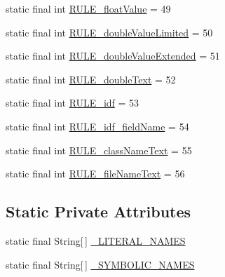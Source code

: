 \begin{DoxyCompactItemize}
\item 
static final int \hyperlink{classgov_1_1nasa_1_1jpf_1_1inspector_1_1server_1_1expression_1_1parser_1_1_expression_grammar_parser_a99701f7d45f221040419b8cb8bd2f5bd}{R\+U\+L\+E\+\_\+float\+Value} = 49
\item 
static final int \hyperlink{classgov_1_1nasa_1_1jpf_1_1inspector_1_1server_1_1expression_1_1parser_1_1_expression_grammar_parser_adc313d7e41c4bd2bc70fd3c607d4f57b}{R\+U\+L\+E\+\_\+double\+Value\+Limited} = 50
\item 
static final int \hyperlink{classgov_1_1nasa_1_1jpf_1_1inspector_1_1server_1_1expression_1_1parser_1_1_expression_grammar_parser_a2894a880588876977c9a53fd38cfa1c2}{R\+U\+L\+E\+\_\+double\+Value\+Extended} = 51
\item 
static final int \hyperlink{classgov_1_1nasa_1_1jpf_1_1inspector_1_1server_1_1expression_1_1parser_1_1_expression_grammar_parser_ac6636ee75a7a441a8ecfe4014c70b3cd}{R\+U\+L\+E\+\_\+double\+Text} = 52
\item 
static final int \hyperlink{classgov_1_1nasa_1_1jpf_1_1inspector_1_1server_1_1expression_1_1parser_1_1_expression_grammar_parser_a3b14668e4f9b361b854d5a89ea69cc57}{R\+U\+L\+E\+\_\+idf} = 53
\item 
static final int \hyperlink{classgov_1_1nasa_1_1jpf_1_1inspector_1_1server_1_1expression_1_1parser_1_1_expression_grammar_parser_a9f8955c25b276b2d4fcf9863b14f0cd0}{R\+U\+L\+E\+\_\+idf\+\_\+field\+Name} = 54
\item 
static final int \hyperlink{classgov_1_1nasa_1_1jpf_1_1inspector_1_1server_1_1expression_1_1parser_1_1_expression_grammar_parser_afa2f2b9a74dc2088cce3eee6feb9a457}{R\+U\+L\+E\+\_\+class\+Name\+Text} = 55
\item 
static final int \hyperlink{classgov_1_1nasa_1_1jpf_1_1inspector_1_1server_1_1expression_1_1parser_1_1_expression_grammar_parser_af204747134eaa8f28361ad75372da05e}{R\+U\+L\+E\+\_\+file\+Name\+Text} = 56
\end{DoxyCompactItemize}
\subsection*{Static Private Attributes}
\begin{DoxyCompactItemize}
\item 
static final String\mbox{[}$\,$\mbox{]} \hyperlink{classgov_1_1nasa_1_1jpf_1_1inspector_1_1server_1_1expression_1_1parser_1_1_expression_grammar_parser_a6ecbb9f236329eb444c93090a3c66e66}{\+\_\+\+L\+I\+T\+E\+R\+A\+L\+\_\+\+N\+A\+M\+ES}
\item 
static final String\mbox{[}$\,$\mbox{]} \hyperlink{classgov_1_1nasa_1_1jpf_1_1inspector_1_1server_1_1expression_1_1parser_1_1_expression_grammar_parser_a9eda66b9734ba96aa3bb44d7b5f09987}{\+\_\+\+S\+Y\+M\+B\+O\+L\+I\+C\+\_\+\+N\+A\+M\+ES}
\end{DoxyCompactItemize}


